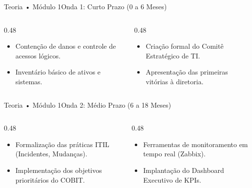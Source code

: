 \begin{senaiframe}{Teoria • Módulo 1}{Onda 1: Curto Prazo (0 a 6 Meses)}
  \begin{columns}[t]
    \begin{column}{0.48\textwidth}
      \begin{tcolorbox}[senaibluecard, title={Foco em Quick Wins}]
        \begin{itemize}
          \item Contenção de danos e controle de acessos lógicos.
          \item Inventário básico de ativos e sistemas.
        \end{itemize}
      \end{tcolorbox}
    \end{column}
    \begin{column}{0.48\textwidth}
      \begin{tcolorbox}[senaigreencard, title={Estrutura Inicial}]
        \begin{itemize}
          \item Criação formal do Comitê Estratégico de TI.
          \item Apresentação das primeiras vitórias à diretoria.
        \end{itemize}
      \end{tcolorbox}
    \end{column}
  \end{columns}
\end{senaiframe}

\begin{senaiframe}{Teoria • Módulo 1}{Onda 2: Médio Prazo (6 a 18 Meses)}
  \begin{columns}[t]
    \begin{column}{0.48\textwidth}
      \begin{tcolorbox}[senaiambercard, title={Estruturação de Processos}]
        \begin{itemize}
          \item Formalização das práticas ITIL (Incidentes, Mudanças).
          \item Implementação dos objetivos prioritários do COBIT.
        \end{itemize}
      \end{tcolorbox}
    \end{column}
    \begin{column}{0.48\textwidth}
      \begin{tcolorbox}[senaicard, title={Monitoramento}]
        \begin{itemize}
          \item Ferramentas de monitoramento em tempo real (Zabbix).
          \item Implantação do Dashboard Executivo de KPIs.
        \end{itemize}
      \end{tcolorbox}
    \end{column}
  \end{columns}
\end{senaiframe}

